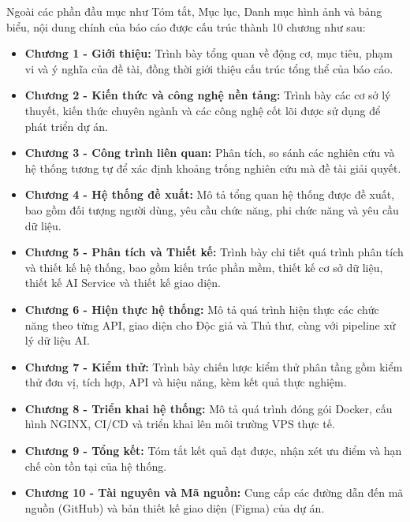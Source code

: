 Ngoài các phần đầu mục như Tóm tắt, Mục lục, Danh mục hình ảnh và bảng biểu, nội dung chính của báo cáo được cấu trúc thành 10 chương như sau:
\begin{itemize}
    \item \textbf{Chương 1 - Giới thiệu:} Trình bày tổng quan về động cơ, mục tiêu, phạm vi và ý nghĩa của đề tài, đồng thời giới thiệu cấu trúc tổng thể của báo cáo.

    \item \textbf{Chương 2 - Kiến thức và công nghệ nền tảng:} Trình bày các cơ sở lý thuyết, kiến thức chuyên ngành và các công nghệ cốt lõi được sử dụng để phát triển dự án.

    \item \textbf{Chương 3 - Công trình liên quan:} Phân tích, so sánh các nghiên cứu và hệ thống tương tự để xác định khoảng trống nghiên cứu mà đề tài giải quyết.

    \item \textbf{Chương 4 - Hệ thống đề xuất:} Mô tả tổng quan hệ thống được đề xuất, bao gồm đối tượng người dùng, yêu cầu chức năng, phi chức năng và yêu cầu dữ liệu.

    \item \textbf{Chương 5 - Phân tích và Thiết kế:} Trình bày chi tiết quá trình phân tích và thiết kế hệ thống, bao gồm kiến trúc phần mềm, thiết kế cơ sở dữ liệu, thiết kế AI Service và thiết kế giao diện.

    \item \textbf{Chương 6 - Hiện thực hệ thống:} Mô tả quá trình hiện thực các chức năng theo từng API, giao diện cho Độc giả và Thủ thư, cùng với pipeline xử lý dữ liệu AI.

    \item \textbf{Chương 7 - Kiểm thử:} Trình bày chiến lược kiểm thử phân tầng gồm kiểm thử đơn vị, tích hợp, API và hiệu năng, kèm kết quả thực nghiệm.

    \item \textbf{Chương 8 - Triển khai hệ thống:} Mô tả quá trình đóng gói Docker, cấu hình NGINX, CI/CD và triển khai lên môi trường VPS thực tế.

    \item \textbf{Chương 9 - Tổng kết:} Tóm tắt kết quả đạt được, nhận xét ưu điểm và hạn chế còn tồn tại của hệ thống.

    \item \textbf{Chương 10 - Tài nguyên và Mã nguồn:} Cung cấp các đường dẫn đến mã nguồn (GitHub) và bản thiết kế giao diện (Figma) của dự án.
\end{itemize}